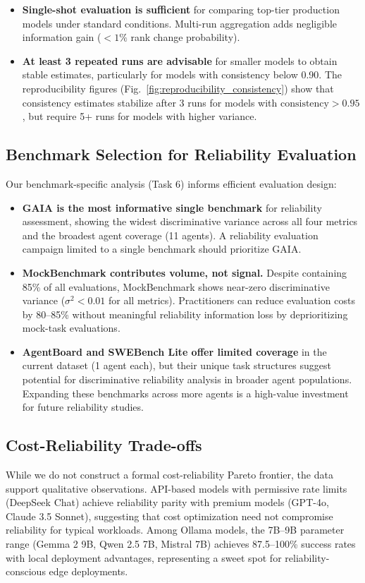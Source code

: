 \begin{itemize}
    \item \textbf{Single-shot evaluation is sufficient} for comparing top-tier production models under standard conditions. Multi-run aggregation adds negligible information gain ($< 1\%$ rank change probability).
    \item \textbf{At least 3 repeated runs are advisable} for smaller models to obtain stable estimates, particularly for models with consistency below 0.90. The reproducibility figures (Fig.~\ref{fig:reproducibility_consistency}) show that consistency estimates stabilize after 3 runs for models with $\text{consistency} > 0.95$, but require 5+ runs for models with higher variance.
\end{itemize}

\subsection{Benchmark Selection for Reliability Evaluation}

Our benchmark-specific analysis (Task 6) informs efficient evaluation design:

\begin{itemize}
    \item \textbf{GAIA is the most informative single benchmark} for reliability assessment, showing the widest discriminative variance across all four metrics and the broadest agent coverage (11 agents). A reliability evaluation campaign limited to a single benchmark should prioritize GAIA.
    \item \textbf{MockBenchmark contributes volume, not signal.} Despite containing 85\% of all evaluations, MockBenchmark shows near-zero discriminative variance ($\sigma^2 < 0.01$ for all metrics). Practitioners can reduce evaluation costs by 80--85\% without meaningful reliability information loss by deprioritizing mock-task evaluations.
    \item \textbf{AgentBoard and SWEBench Lite offer limited coverage} in the current dataset (1 agent each), but their unique task structures suggest potential for discriminative reliability analysis in broader agent populations. Expanding these benchmarks across more agents is a high-value investment for future reliability studies.
\end{itemize}

\subsection{Cost-Reliability Trade-offs}

While we do not construct a formal cost-reliability Pareto frontier, the data support qualitative observations. API-based models with permissive rate limits (DeepSeek Chat) achieve reliability parity with premium models (GPT-4o, Claude 3.5 Sonnet), suggesting that cost optimization need not compromise reliability for typical workloads. Among Ollama models, the 7B--9B parameter range (Gemma 2 9B, Qwen 2.5 7B, Mistral 7B) achieves 87.5--100\% success rates with local deployment advantages, representing a sweet spot for reliability-conscious edge deployments.
